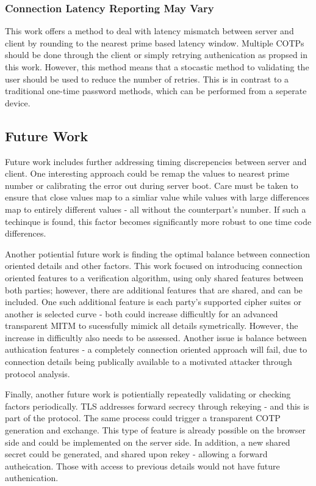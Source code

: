 \documentclass[a4paper, 11pt]{article} 				%
\begin{document}
\subsubsection{Connection Latency Reporting May Vary}
This work offers a method to deal with latency mismatch between server and client by rounding to the nearest prime based latency window. Multiple COTPs should be done through the client or simply retrying authenication as propsed in this work. However, this method means that a stocastic method to validating the user should be used to reduce the number of retries. This is in contrast to a traditional one-time password methods, which can be performed from a seperate device. 

\subsection{Future Work}
Future work includes further addressing timing discrepencies between server and client. One interesting approach could be remap the values to nearest prime number or calibrating the error out during server boot. Care must be taken to ensure that close values map to a simliar value while values with large differences map to entirely different values - all without the counterpart's number. If such a techinque is found, this factor becomes significantly more robust to one time code differences.

Another potiential future work is finding the optimal balance between connection oriented details and other factors. This work focused on introducing connection oriented features to a verification algorithm, using only shared features between both parties; however, there are additional features that are shared, and can be included. One such additional feature is each party's supported cipher suites or another is selected curve - both could increase difficultly for an advanced transparent MITM to sucessfully mimick all details symetrically. However, the increase in difficultly also needs to be assessed. Another issue is balance between authication features - a completely connection oriented approach will fail, due to connection details being publically available to a motivated attacker through protocol analysis.

Finally, another future work is potientially repeatedly validating or checking factors periodically. TLS addresses forward secrecy through rekeying - and this is part of the protocol. The same process could trigger a transparent COTP generation and exchange. This type of feature is already possible on the browser side and could be implemented on the server side. In addition, a new shared secret could be generated, and shared upon rekey - allowing a forward autheication. Those with access to previous details would not have future authenication. 
\end{document}
